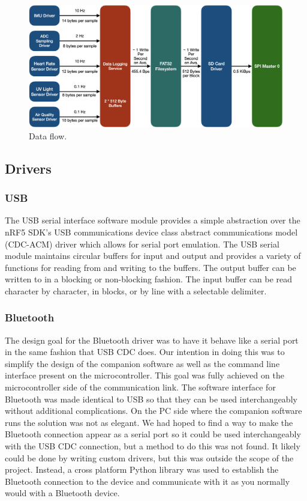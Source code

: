 \begin{figure}[!htb]
\centering
\includegraphics[width=\textwidth]{images/fw_data_flow.png}
\caption{Data flow.}
\label{fig:fw_data_flow}
\end{figure}

\subsection{Drivers}

\subsubsection{USB}

The USB serial interface software module provides a simple abstraction over the
nRF5 SDK's USB communications device class abstract communications model
(CDC-ACM) driver which allows for serial port emulation. The USB serial module
maintains circular buffers for input and output and provides a variety of
functions for reading from and writing to the buffers. The output buffer can be
written to in a blocking or non-blocking fashion. The input buffer can be read
character by character, in blocks, or by line with a selectable delimiter.

\subsubsection{Bluetooth}

The design goal for the Bluetooth driver was to have it behave like a serial
port in the same fashion that USB CDC does. Our intention in doing this was to 
simplify the design of the companion software as well as the command line 
interface present on the microcontroller. This goal was fully achieved 
on the microcontroller side of the communication link. The software interface for 
Bluetooth was made identical to USB so that they can be used interchangeably 
without additional complications. On the PC side where the companion software
runs the solution was not as elegant. We had hoped to find a way to make the
Bluetooth connection appear as a serial port so it could be used interchangeably
with the USB CDC connection, but a method to do this was not found. It likely
could be done by writing custom drivers, but this was outside the scope of the
project. Instead, a cross platform Python library was used to establish the
Bluetooth connection to the device and communicate with it as you normally
would with a Bluetooth device.

